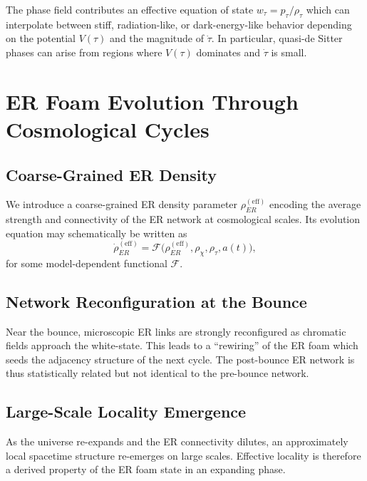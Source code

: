The phase field contributes an effective equation of state $w_\tau = p_\tau/\rho_\tau$ which can interpolate between stiff, radiation-like, or dark-energy-like behavior depending on the potential $V(\tau)$ and the magnitude of $\dot{\tau}$.
In particular, quasi-de Sitter phases can arise from regions where $V(\tau)$ dominates and $\dot{\tau}$ is small.


\chapter{ER Foam Evolution Through Cosmological Cycles}

\section{Coarse-Grained ER Density}

We introduce a coarse-grained ER density parameter $\rho_{ER}^{\mathrm{(eff)}}$ encoding the average strength and connectivity of the ER network at cosmological scales.
Its evolution equation may schematically be written as
\[
  \dot{\rho}_{ER}^{\mathrm{(eff)}}
  =
  \mathcal{F}\big(\rho_{ER}^{\mathrm{(eff)}}, \rho_\chi, \rho_\tau, a(t)\big),
\]
for some model-dependent functional $\mathcal{F}$.

\section{Network Reconfiguration at the Bounce}

Near the bounce, microscopic ER links are strongly reconfigured as chromatic fields approach the white-state.
This leads to a ``rewiring'' of the ER foam which seeds the adjacency structure of the next cycle.
The post-bounce ER network is thus statistically related but not identical to the pre-bounce network.

\section{Large-Scale Locality Emergence}

As the universe re-expands and the ER connectivity dilutes, an approximately local spacetime structure re-emerges on large scales.
Effective locality is therefore a derived property of the ER foam state in an expanding phase.


